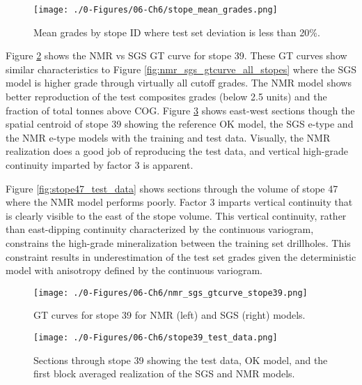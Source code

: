 \begin{figure}[htb!]
    \centering
    \texttt{[image: ./0-Figures/06-Ch6/stope\_mean\_grades.png]}
    \caption{Mean grades by stope ID where test set deviation is less than 20\%. }
    \label{fig:stope_mean_grades}
\end{figure}

Figure \ref{fig:nmr_sgs_gtcurve_stope39} shows the \gls{NMR} vs \gls{SGS} \gls{GT} curve for stope 39. These \gls{GT} curves show similar characteristics to Figure \ref{fig:nmr_sgs_gtcurve_all_stopes} where the \gls{SGS} model is higher grade through virtually all cutoff grades. The \gls{NMR} model shows better reproduction of the test composites grades (below 2.5 units) and the fraction of total tonnes above \gls{COG}. Figure \ref{fig:stope39_test_data} shows east-west sections though the spatial centroid of stope 39 showing the reference \gls{OK} model, the \gls{SGS} e-type and the \gls{NMR} e-type models with the training and test data. Visually, the \gls{NMR} realization does a good job of reproducing the test data, and vertical high-grade continuity imparted by factor 3 is apparent.

Figure \ref{fig:stope47_test_data} shows sections through the volume of stope 47 where the \gls{NMR} model performs poorly. Factor 3 imparts vertical continuity that is clearly visible to the east of the stope volume. This vertical continuity, rather than east-dipping continuity characterized by the continuous variogram, constrains the high-grade mineralization between the training set drillholes. This constraint results in underestimation of the test set grades given the deterministic model with anisotropy defined by the continuous variogram.

\begin{figure}[htb!]
    \centering
    \texttt{[image: ./0-Figures/06-Ch6/nmr\_sgs\_gtcurve\_stope39.png]}
    \caption{\Gls{GT} curves for stope 39 for \gls{NMR} (left) and \gls{SGS} (right) models. }
    \label{fig:nmr_sgs_gtcurve_stope39}
\end{figure}

\begin{figure}[htb!]
    \centering
    \texttt{[image: ./0-Figures/06-Ch6/stope39\_test\_data.png]}
    \caption{Sections through stope 39 showing the test data, \gls{OK} model, and the first block averaged realization of the \gls{SGS} and \gls{NMR} models.}
    \label{fig:stope39_test_data}
\end{figure}

